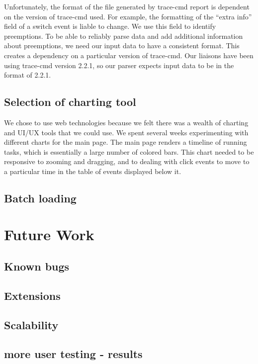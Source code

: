 \documentclass{hmcclinic}
\begin{document}
  Unfortunately, the format of the file generated by trace-cmd report is
  dependent on the version of trace-cmd used. For example, the formatting of the
  ``extra info'' field of a switch event is liable to change. We use this
  field to identify preemptions. To be able to reliably parse data and add
  additional information about preemptions, we need our input data to have
  a consistent format. This creates a dependency on a particular version
  of trace-cmd. Our liaisons have been using trace-cmd version 2.2.1, so
  our parser expects input data to be in the format of 2.2.1.
\section{Selection of charting tool} %
  We chose to use web technologies because we felt there was a wealth of
  charting and UI/UX tools that we could use. We spent several weeks
  experimenting with different charts for the main page. The main page renders a
  timeline of running tasks, which is essentially a large number of colored
  bars. This chart needed to be responsive to zooming and dragging, and to
  dealing with click events to move to a particular time in the table of events
  displayed below it.
\section{Batch loading}

\chapter{Future Work}
\section{Known bugs}
\section{Extensions}
\section{Scalability}
\section{more user testing - results}
\end{document}
